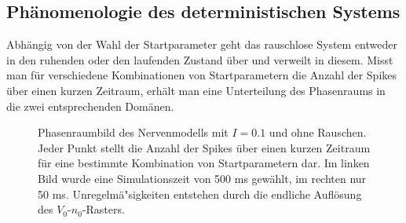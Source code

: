 \documentclass[12pt,a4paper]{article}
\begin{document}
\subsection{Phänomenologie des deterministischen Systems}
Abhängig von der Wahl der Startparameter geht das rauschlose System entweder in den ruhenden oder den laufenden Zustand über und verweilt in diesem. Misst man für verschiedene Kombinationen von Startparametern die Anzahl der Spikes über einen kurzen Zeitraum, erhält man eine Unterteilung des Phasenraums in die zwei entsprechenden Domänen.
\begin{figure}[H]
	\hspace*{-0.5cm}
	
	\caption{Phasenraumbild des Nervenmodells mit $I=0.1$ und ohne Rauschen. Jeder Punkt stellt die Anzahl der Spikes über einen kurzen Zeitraum für eine bestimmte Kombination von Startparametern dar. Im linken Bild wurde eine Simulationszeit von 500 ms gewählt, im rechten nur 50 ms. Unregelmä"sigkeiten entstehen durch die endliche Auflösung des $V_0$-$n_0$-Rasters.}
	\label{twodom}
\end{figure}		
\end{document}

